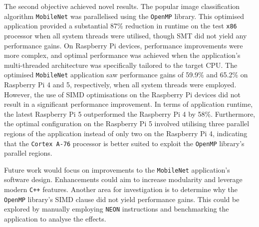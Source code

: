 The second objective achieved novel results. The popular image classification algorithm \texttt{MobileNet}\cite{mobilenet_paper}\cite{mobilenet_repo} was parallelised using the \texttt{OpenMP} library. This optimised application provided a substantial 87\% reduction in runtime on the test \texttt{x86} processor when all system threads were utilised, though SMT did not yield any performance gains. On Raspberry Pi devices, performance improvements were more complex, and optimal performance was achieved when the application's multi-threaded architecture was specifically tailored to the target CPU. The optimised \texttt{MobileNet} application saw performance gains of 59.9\% and 65.2\% on Raspberry Pi 4 and 5, respectively, when all system threads were employed. However, the use of SIMD optimisations on the Raspberry Pi devices did not result in a significant performance improvement. In terms of application runtime, the latest Raspberry Pi 5 outperformed the Raspberry Pi 4 by 58\%. Furthermore, the optimal configuration on the Raspberry Pi 5 involved utilising three parallel regions of the application instead of only two on the Raspberry Pi 4, indicating that the \texttt{Cortex A-76} processor is better suited to exploit the \texttt{OpenMP} library's parallel regions.

Future work would focus on improvements to the \texttt{MobileNet} application’s software design. Enhancements could aim to increase modularity and leverage modern \texttt{C++} features. Another area for investigation is to determine why the \texttt{OpenMP} library's SIMD clause did not yield performance gains. This could be explored by manually employing \texttt{NEON} instructions and benchmarking the application to analyse the effects.

